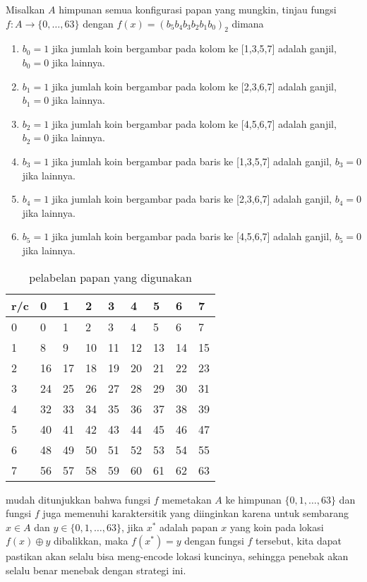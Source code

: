\documentclass[12pt,letterpaper]{article}
\begin{document}
Misalkan $A$ himpunan semua konfigurasi papan yang mungkin, tinjau fungsi $f :A \rightarrow\{0,\dots,63\}$
 dengan $f(x)=  (b_ 5 b_4 b_3 b_2 b_1 b_0)_2 $ dimana
 \begin{enumerate}
    \item $ b_0=1$ jika jumlah koin bergambar pada kolom ke [1,3,5,7] adalah ganjil, $b_0=0$ jika lainnya. 
    \item $ b_1=1$ jika jumlah koin bergambar pada kolom ke [2,3,6,7] adalah ganjil, $b_1=0$ jika lainnya. 
    \item $ b_2=1$ jika jumlah koin bergambar pada kolom ke [4,5,6,7] adalah ganjil, $b_2=0$ jika lainnya. 
    \item $ b_3=1$ jika jumlah koin bergambar pada baris ke [1,3,5,7] adalah ganjil, $b_3=0$ jika lainnya. 
    \item $ b_4=1$ jika jumlah koin bergambar pada baris ke [2,3,6,7] adalah ganjil, $b_4=0$ jika lainnya. 
    \item $ b_5=1$ jika jumlah koin bergambar pada baris ke [4,5,6,7] adalah ganjil, $b_5=0$ jika lainnya. 
\end{enumerate}
\begin{table}[H]
    \centering
    \caption{pelabelan papan yang digunakan}
    \begin{tabular}{|l||l|l|l|l|l|l|l|l|}
    \hline
        r/c & 0 & 1 & 2 & 3 & 4 & 5 & 6 & 7 \\ \hline\hline
        0 & 0 & 1 & 2 & 3 & 4 & 5 & 6 & 7 \\ \hline
        1 & 8 & 9 & 10 & 11 & 12 & 13 & 14 & 15 \\ \hline
        2 & 16 & 17 & 18 & 19 & 20 & 21 & 22 & 23 \\ \hline
        3 & 24 & 25 & 26 & 27 & 28 & 29 & 30 & 31 \\ \hline
        4 & 32 & 33 & 34 & 35 & 36 & 37 & 38 & 39 \\ \hline
        5 & 40 & 41 & 42 & 43 & 44 & 45 & 46 & 47 \\ \hline
        6 & 48 & 49 & 50 & 51 & 52 & 53 & 54 & 55 \\ \hline
        7 & 56 & 57 & 58 & 59 & 60 & 61 & 62 & 63 \\ \hline
    \end{tabular}
    \label{papan}
\end{table}

mudah ditunjukkan bahwa fungsi $f$ memetakan $A$ ke himpunan $\{0,1,\dots, 63\}$ dan fungsi $f$ juga memenuhi
karaktersitik yang diinginkan karena untuk sembarang $x\in A$ dan $y\in \{0,1,\dots, 63\}$, jika $x^{*}$ adalah
papan $x$ yang koin pada lokasi $f(x) \oplus y$ dibalikkan, maka $f(x^{*})=y$
dengan fungsi $f$ tersebut, kita dapat pastikan akan selalu bisa meng-encode lokasi kuncinya,
sehingga penebak akan selalu benar menebak dengan strategi ini.
\end{document}
